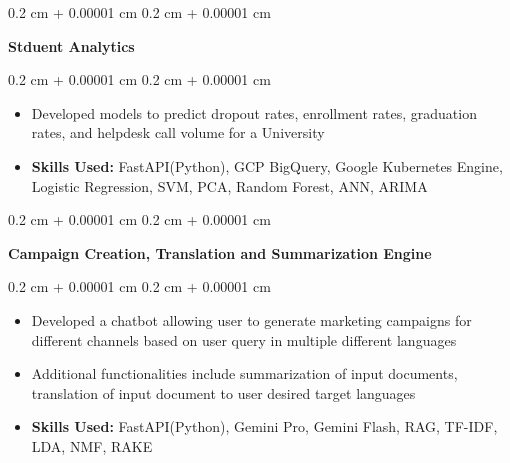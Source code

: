 \documentclass[10pt, letterpaper]{article}
\newenvironment{highlights}{
    \begin{itemize}[
        topsep=0.10 cm,
        parsep=0.10 cm,
        partopsep=0pt,
        itemsep=0pt,
        leftmargin=0.4 cm + 10pt
    ]
}{
    \end{itemize}
} %
\newenvironment{onecolentry}{
    \begin{adjustwidth}{
        0.2 cm + 0.00001 cm
    }{
        0.2 cm + 0.00001 cm
    }
}{
    \end{adjustwidth}
} %
\begin{document}
        \vspace{0.2 cm}

        \begin{onecolentry}
            \textbf{Stduent Analytics}
        \end{onecolentry}
        \vspace{0.10 cm}
        \begin{onecolentry}
            \begin{highlights}
                \item Developed models to predict dropout rates, enrollment rates, graduation rates, and helpdesk call volume for a University
                \item \textbf{Skills Used:} FastAPI(Python), GCP BigQuery, Google Kubernetes Engine, Logistic Regression, SVM, PCA, Random Forest, ANN, ARIMA
            \end{highlights}
        \end{onecolentry}
        

        
        \vspace{0.2 cm}
        
        \begin{onecolentry}
            \textbf{Campaign Creation, Translation and Summarization Engine}
        \end{onecolentry}
        \vspace{0.10 cm}
        \begin{onecolentry}
            \begin{highlights}
                \item Developed a chatbot allowing user to generate marketing campaigns for different channels based on user query in multiple different languages
                \item Additional functionalities include summarization of input documents, translation of input document to user desired target languages
                \item \textbf{Skills Used:} FastAPI(Python), Gemini Pro, Gemini Flash, RAG, TF-IDF, LDA, NMF, RAKE
            \end{highlights}
        \end{onecolentry}
\end{document}
